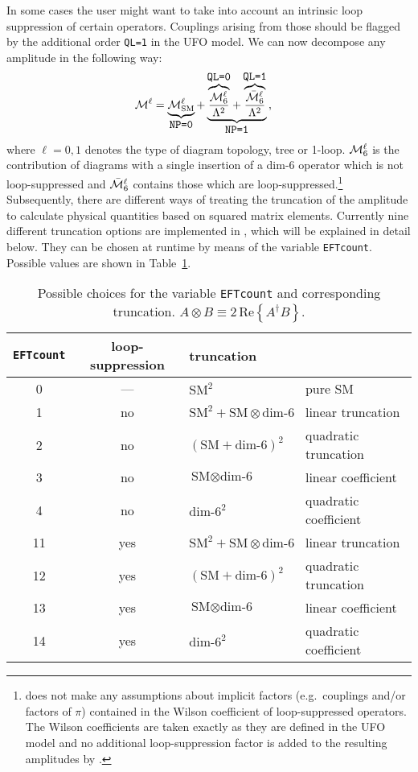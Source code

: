 In some cases the user might want to take into account an intrinsic loop suppression of certain operators. Couplings arising from those should be flagged by the additional order \texttt{QL=1} in the UFO model. We can now decompose any amplitude in the following way:
\begin{align}\label{eq:amp_truncation}
   \mathcal{M}^\ell &= \underbrace{\mathcal{M}^\ell_\mathrm{SM}}_{\displaystyle\texttt{NP=0}} + \underbrace{\overbrace{\frac{\mathcal{M}^\ell_6}{\Lambda^2}}^{\displaystyle\texttt{QL=0}}  + \overbrace{\frac{\bar{\mathcal{M}}^\ell_6}{\Lambda^2}}^{\displaystyle\texttt{QL=1}}}_{\displaystyle\texttt{NP=1}}\,,
\end{align}
where $\ell=0,1$ denotes the type of diagram topology, tree or 1-loop. $\mathcal{M}^\ell_6$ is the contribution of diagrams with a single insertion of a dim-6 operator which is not loop-suppressed and $\bar{\mathcal{M}}^\ell_6$ contains those which are loop-suppressed.\footnote{\gosam does not make any assumptions about implicit factors (e.g.\ couplings and/or factors of $\pi$) contained in the Wilson coefficient of loop-suppressed operators. The Wilson coefficients are taken exactly as they are defined in the UFO model and no additional loop-suppression factor is added to the resulting amplitudes by \gosam.} Subsequently, there are different ways of treating the truncation of the amplitude to calculate physical quantities based on squared matrix elements. Currently nine different truncation options are implemented in \gosam, which will be explained in detail below. They can be chosen at runtime by means of the variable \texttt{EFTcount}. Possible values are shown in Table~\ref{tab:EFTcount}.

\begin{table}
\renewcommand{\arraystretch}{1.5}
\centering
\begin{tabular}{c|c|l|l}
   \texttt{EFTcount} & loop-suppression & truncation & \\
\hline
   0 & --- & $\text{SM}^2$ & pure SM\\
\hline
   1 & no & $\text{SM}^2 + \text{SM}\otimes\text{dim-6}$ & linear truncation\\
   2 & no & $\left(\text{SM}+\text{dim-6}\right)^2$ & quadratic truncation\\
   3 & no & $\text{SM}\otimes\text{dim-6}$ & linear coefficient\\
   4 & no & $\text{dim-6}^2$ & quadratic coefficient\\
\hline
   11 & yes & $\text{SM}^2 + \text{SM}\otimes\text{dim-6}$ & linear truncation\\
   12 & yes & $\left(\text{SM}+\text{dim-6}\right)^2$ & quadratic truncation\\
   13 & yes & $\text{SM}\otimes\text{dim-6}$ & linear coefficient\\
   14 & yes & $\text{dim-6}^2$ & quadratic coefficient
\end{tabular}
\caption{Possible choices for the variable \texttt{EFTcount} and corresponding truncation. $A\otimes B\equiv2\,\mathrm{Re}\left\{A^\dagger B\right\}$.}
\label{tab:EFTcount}
\renewcommand{\arraystretch}{1.25}
\end{table}

